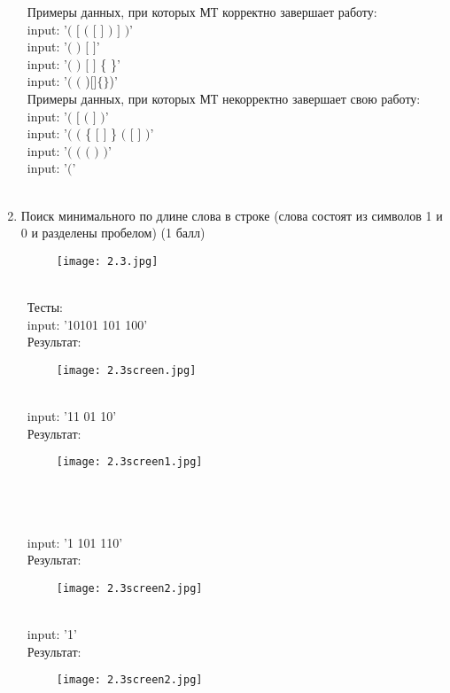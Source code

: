 \documentclass[a4paper]{article}
\begin{document}
\begin{enumerate}
\ Примеры данных, при которых МТ корректно завершает работу:\\
\ input: '$($ $[$ $($ $[$ $]$ $)$ $]$ $)$' \\
\ input: '$($ $)$ $[$ $]$' \\
\ input: '$($ $)$ $[$ $]$ \{ \}' \\
\ input: '$($ $($ )$ $[$ $]$ \{\}$)' \\
\ Примеры данных, при которых МТ некорректно завершает свою работу:\\
\ input: '$($ $[$ $($ $]$ $)$'\\
\ input: '$($ $($ \{ $[$ $]$ \} $($ $[$ $]$ $)$'\\
\ input: '$($ $($ $($ $)$ $)$'\\
\ input: '$($'\\
\\
\newpage
    \item Поиск минимального по длине слова в строке (слова состоят из символов 1 и 0 и разделены пробелом) (1 балл)
   \begin{figure}[h]
        \centering
        \texttt{[image: 2.3.jpg]}
   \end{figure}\\ 
\ Тесты:\\
\ input: '10101 101 100' \\
\ Результат:\\
   \begin{figure}[h]
        \centering
        \texttt{[image: 2.3screen.jpg]}
   \end{figure}\\ 
\ input: '11 01 10'\\
\ Результат:
   \begin{figure}[h]
        \centering
        \texttt{[image: 2.3screen1.jpg]}
   \end{figure}\\ 
\\ \\
\ input: '1 101 110'\\
\ Результат:\\
   \begin{figure}[h]
        \centering
        \texttt{[image: 2.3screen2.jpg]}
   \end{figure}\\ 
\ input: '1'\\
\ Результат:\\
   \begin{figure}[h]
        \centering
        \texttt{[image: 2.3screen2.jpg]}
   \end{figure}\\ 
\end{enumerate}\\
\end{document}
